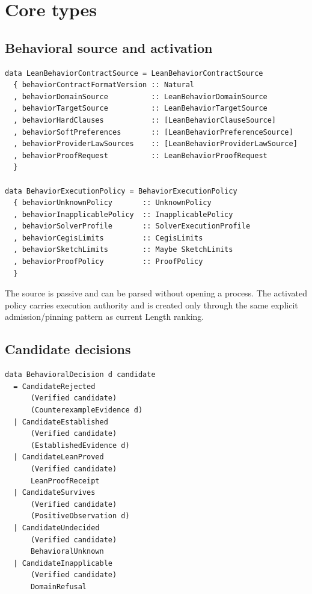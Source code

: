 \documentclass[11pt,oneside]{report}
\begin{document}
\section{Core types}

\subsection{Behavioral source and activation}

\begin{lstlisting}[language=HaskellX,caption={Proposed passive contract and activated policy split.},label={lst:source-policy}]
data LeanBehaviorContractSource = LeanBehaviorContractSource
  { behaviorContractFormatVersion :: Natural
  , behaviorDomainSource          :: LeanBehaviorDomainSource
  , behaviorTargetSource          :: LeanBehaviorTargetSource
  , behaviorHardClauses           :: [LeanBehaviorClauseSource]
  , behaviorSoftPreferences       :: [LeanBehaviorPreferenceSource]
  , behaviorProviderLawSources    :: [LeanBehaviorProviderLawSource]
  , behaviorProofRequest          :: LeanBehaviorProofRequest
  }

data BehaviorExecutionPolicy = BehaviorExecutionPolicy
  { behaviorUnknownPolicy       :: UnknownPolicy
  , behaviorInapplicablePolicy  :: InapplicablePolicy
  , behaviorSolverProfile       :: SolverExecutionProfile
  , behaviorCegisLimits         :: CegisLimits
  , behaviorSketchLimits        :: Maybe SketchLimits
  , behaviorProofPolicy         :: ProofPolicy
  }
\end{lstlisting}

The source is passive and can be parsed without opening a process. The activated policy carries execution authority and is created only through the same explicit admission/pinning pattern as current Length ranking.

\subsection{Candidate decisions}

\begin{lstlisting}[language=HaskellX,caption={Candidate decision vocabulary.},label={lst:decision}]
data BehavioralDecision d candidate
  = CandidateRejected
      (Verified candidate)
      (CounterexampleEvidence d)
  | CandidateEstablished
      (Verified candidate)
      (EstablishedEvidence d)
  | CandidateLeanProved
      (Verified candidate)
      LeanProofReceipt
  | CandidateSurvives
      (Verified candidate)
      (PositiveObservation d)
  | CandidateUndecided
      (Verified candidate)
      BehavioralUnknown
  | CandidateInapplicable
      (Verified candidate)
      DomainRefusal
\end{lstlisting}
\end{document}
